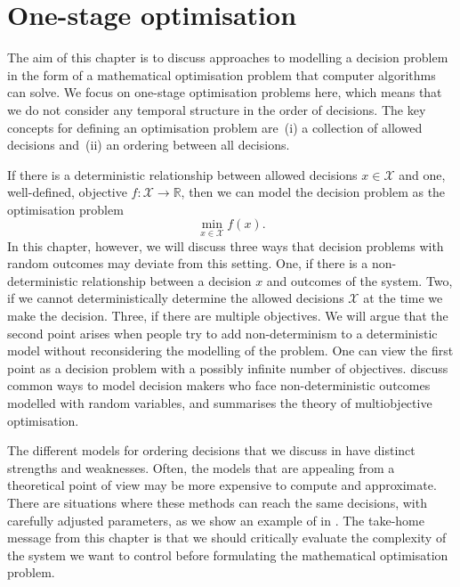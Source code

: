 \documentclass[main.tex]{subfiles}
\begin{document}
\chtodolist{} %

\chapter{One-stage optimisation}\label{ch:onestage}


The aim of this chapter is to discuss approaches to modelling a
decision problem in the form of a mathematical optimisation problem
that computer algorithms can solve.
We focus on one-stage optimisation problems here, which means that
we do not consider any temporal structure in the order of decisions.
The key concepts for defining an optimisation problem are~(i) a
collection of allowed decisions and~(ii) an ordering between all
decisions.

If there is a deterministic relationship between allowed decisions
$x\in\mathcal{X}$ and one, well-defined, objective
$f:\mathcal{X}\to\mathbb{R}$, then we can model the decision problem
as the optimisation problem
\begin{equation}
  \min_{x\in\mathcal{X}} f(x).
\end{equation}
In this chapter, however, we will discuss three ways that
decision problems with random outcomes may deviate from this setting.
One, if there is a non-deterministic relationship between a decision
$x$ and outcomes of the system. Two, if we cannot
deterministically determine the allowed decisions
$\mathcal{X}$ at the time we make the decision. Three, if there are
multiple objectives.
We will argue that the second point arises when people try to add
non-determinism to a deterministic model without reconsidering the
modelling of the problem. One can view the first point as a decision
problem with a possibly infinite number of objectives.
discuss common ways to model decision makers who face
non-deterministic outcomes modelled with random variables, and
 summarises the theory of multiobjective
optimisation.


The different models for ordering decisions that we discuss in
 have distinct strengths and
weaknesses. Often, the models that are appealing
from a theoretical point of view may be more expensive to compute and
approximate. There are situations where these methods can reach the
same decisions, with carefully adjusted parameters, as we show an
example of in . The take-home
message from this chapter is
that we should critically evaluate the complexity of the system we want
to control before formulating the mathematical optimisation problem.
\end{document}

